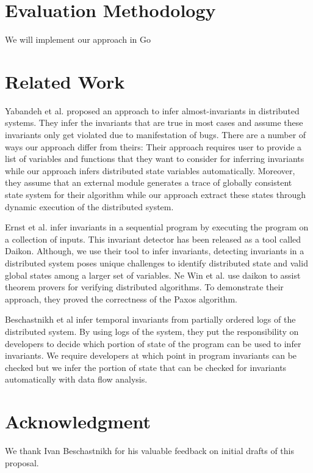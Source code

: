 \section{Evaluation Methodology}
We will implement our approach in Go

\section{Related Work}

Yabandeh et al.\cite{yabandeh2011finding} proposed an approach to
infer almost-invariants in distributed systems. They infer the
invariants that are true in most cases and assume these invariants
only get violated due to manifestation of bugs. There are a number of
ways our approach differ from theirs: Their approach requires user to
provide a list of variables and functions that they want to consider
for inferring invariants while our approach infers distributed state
variables automatically. Moreover, they assume that an external module
generates a trace of globally consistent state system for their
algorithm while our approach extract these states through dynamic
execution of the distributed system.

Ernst et al.\cite{ernst2001dynamically} infer invariants in a
sequential program by executing the program on a collection of inputs.
This invariant detector has been released as a tool called
Daikon\cite{ernst2007daikon}. Although, we use their tool to infer
invariants, detecting invariants in a distributed system poses unique
challenges to identify distributed state and valid global states among
a larger set of variables. Ne Win et al.\cite{NeWinEGKL04} use daikon
to assist theorem provers for verifying distributed algorithms. To
demonstrate their approach, they proved the correctness of the Paxos
algorithm.

Beschastnikh et al \cite{temporalInv} infer temporal invariants from partially ordered logs of the distributed system. By using logs of the system, they put the responsibility on developers to decide which portion of state of the program can be used to infer invariants. We require developers at which point in program invariants can be checked but we infer the portion of state that can be checked for invariants automatically with data flow analysis.


\section{Acknowledgment}
We thank Ivan Beschastnikh for his valuable feedback on initial drafts of this proposal.